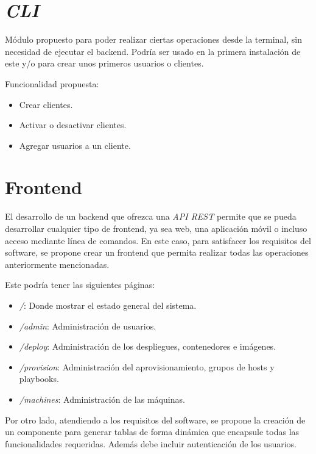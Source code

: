 \section{\textit{CLI}}

Módulo propuesto para poder realizar ciertas operaciones desde la terminal, sin necesidad de ejecutar el backend. Podría ser usado en la primera instalación de este y/o para crear unos primeros usuarios o clientes.

\bigskip
Funcionalidad propuesta:
\begin{itemize}
	\item Crear clientes.
	\item Activar o desactivar clientes.
	\item Agregar usuarios a un cliente.
\end{itemize}




\section{Frontend}

El desarrollo de un backend que ofrezca una \textit{API REST} permite que se pueda desarrollar cualquier tipo de frontend, ya sea web, una aplicación móvil o incluso acceso mediante línea de comandos. En este caso, para satisfacer los requisitos del software, se propone crear un frontend que permita realizar todas las operaciones anteriormente mencionadas.

\bigskip
Este podría tener las siguientes páginas:
\begin{itemize}
	\item \textit{/}: Donde mostrar el estado general del sistema.
	\item \textit{/admin}: Administración de usuarios.
	\item \textit{/deploy}: Administración de los despliegues, contenedores e imágenes.
	\item \textit{/provision}: Administración del aprovisionamiento, grupos de hosts y playbooks.
	\item \textit{/machines}: Administración de las máquinas.
\end{itemize}

\bigskip
Por otro lado, atendiendo a los requisitos del software, se propone la creación de un componente para generar tablas de forma dinámica que encapsule todas las funcionalidades requeridas. Además debe incluir autenticación de los usuarios.

